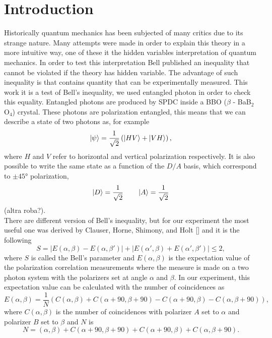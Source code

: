 \documentclass[a4paper,10pt]{article}
\begin{document}
\section{Introduction}
Historically quantum mechanics has been subjected of many critics due to its strange nature. Many attempts were made in order to explain this theory in a more intuitive way, one of these it the hidden variables interpretation of quantum mechanics. In order to test this interpretation Bell published an inequality \cite{bellpaper} that cannot be violated if the theory has hidden variable. The advantage of such inequality is that contains quantity that can be experimentally measured. This work it is a test of Bell's inequality, we used entangled photon in order to check this equality. Entangled photons are produced by SPDC inside a BBO ($\beta$ - BaB$_2$O$_4$) crystal. These photons are polarization entangled, this means that we can describe a state of two photons as, for example
\[\ket{\psi} = \frac{1}{\sqrt{2}}\left(\ket{HV} + \ket{VH}\right),\]
where $H$ and $V$ refer to horizontal and vertical polarization respectively. It is also possible to write the same state as a function of the $D/A$ basis, which correspond to $\pm 45$° polarization,
\[\ket{D} = \frac{1}{\sqrt{2}} \qquad \ket{A} = \frac{1}{\sqrt{2}}\]
(altra roba?).\\
There are different version of Bell's inequality, but for our experiment the most useful one was derived by Clauser, Horne, Shimony, and Holt [] and it is the following
\[S = |E(\alpha,\beta)-E(\alpha,\beta')|+|E(\alpha',\beta)+E(\alpha',\beta')|\leq 2,\]
where $S$ is called the Bell's parameter and $E(\alpha,\beta)$ is the expectation value of the polarization correlation measurements where the measure is made on a two photon system with the polarizers set at angle $\alpha$ and $\beta.$ In our experiment, this expectation value can be calculated with the number of coincidences as
\[E(\alpha,\beta) = \frac{1}{N}(C(\alpha,\beta)+C(\alpha+90,\beta+90)-C(\alpha+90,\beta)-C(\alpha,\beta+90)),\]
where $C(\alpha,\beta)$ is the number of coincidences with polarizer $A$ set to $\alpha$ and polarizer $B$ set to $\beta$ and $N$ is
\[N = (\alpha,\beta)+C(\alpha+90,\beta+90)+C(\alpha+90,\beta)+C(\alpha,\beta+90).\]
\end{document}
